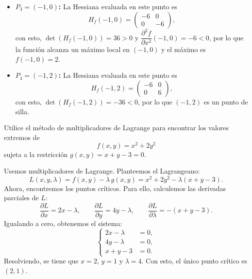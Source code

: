 \documentclass[11pt,respuestas,a4]{aleph-examen}
\begin{document}
\begin{preguntas}
\begin{respuesta}
\begin{itemize}
    \item \textbf{$P_3=(-1,0)$:} La Hessiana evaluada en este punto es
    \[
        H_f(-1,0) = \begin{pmatrix} -6 & 0 \\ 0 & -6 \end{pmatrix},
    \]
    con esto, $\det(H_f(-1,0)) = 36 > 0$ y $\dfrac{\partial^2 f}{\partial x^2}(-1,0) = -6 < 0$, por lo que la función alcanza un máximo local en $(-1,0)$ y el máximo es $f(-1,0) = 2$.

    \item \textbf{$P_4=(-1,2)$:} La Hessiana evaluada en este punto es
    \[
        H_f(-1,2) = \begin{pmatrix} -6 & 0 \\ 0 & 6 \end{pmatrix},
    \]
    con esto, $\det(H_f(-1,2)) = -36 < 0$, por lo que $(-1,2)$ es un punto de silla.\qedhere
\end{itemize}
\end{respuesta}


\item
Utilice el método de multiplicadores de Lagrange para encontrar los valores extremos de
\[
    f(x,y) = x^2 + 2y^2
\]
sujeta a la restricción $g(x,y) = x + y - 3 = 0$.

\begin{respuesta}
Usemos multiplicadores de Lagrange. Planteemos el Lagrangeano:
\[
    L(x,y,\lambda) = f(x,y) - \lambda\,g(x,y) = x^2 + 2y^2 - \lambda(x+y-3).
\]
Ahora, encontremos los puntos críticos. Para ello, calculemos las derivadas parciales de $L$:
\[
    \frac{\partial L}{\partial x} = 2x - \lambda,
    \qquad
    \frac{\partial L}{\partial y} = 4y - \lambda,
    \qquad
    \frac{\partial L}{\partial \lambda} = -(x+y-3).
\]
Igualando a cero, obtenemos el sistema:
\[
    \left\{
    \begin{aligned}
        2x - \lambda &= 0,\\
        4y - \lambda &= 0,\\
        x + y - 3 &= 0.
    \end{aligned}
    \right.
\]
Resolviendo, se tiene que $x = 2$, $y = 1$ y $\lambda = 4$. Con esto, el único punto crítico es $(2,1)$.


\end{respuesta}
\end{preguntas}
\end{document}
